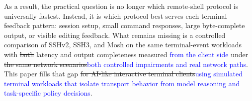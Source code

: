 As a result, the practical question is no longer which remote-shell protocol is universally fastest. Instead, it is which protocol best serves each terminal feedback pattern: session setup, small command responses, large byte-complete output, or visible editing feedback. What remains missing is a controlled comparison of SSHv2, SSH3, and Mosh on the same terminal-event workloads with \sout{both }latency and output completeness measured \textcolor{blue}{from the client side} under \sout{the same network scenarios}\textcolor{blue}{both controlled impairments and real network paths}. This paper fills that gap \sout{for AI-like interactive terminal clients}\textcolor{blue}{using simulated terminal workloads that isolate transport behavior from model reasoning and task-specific policy decisions}.
